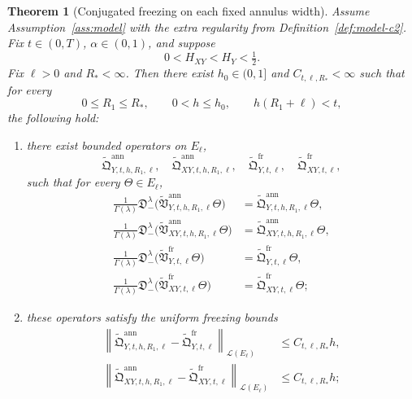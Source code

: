 \documentclass[11pt,a4paper]{amsart}
\theoremstyle{plain}
\newtheorem{theorem}{Theorem}[section]
\theoremstyle{definition}
\theoremstyle{remark}
\begin{document}
\begin{theorem}[Conjugated freezing on each fixed annulus width]
\label{thm:annulus-conjugated}
Assume Assumption~\ref{ass:model} with the extra regularity from
Definition~\ref{def:model-c2}. Fix \(t\in(0,T)\), \(\alpha\in(0,1)\), and suppose
\[
0<H_{XY}<H_Y<\tfrac12.
\]
Fix \(\ell>0\) and \(R_*<\infty\). Then there exist \(h_0\in(0,1]\) and
\(C_{t,\ell,R_*}<\infty\) such that for every
\[
0\le R_1\le R_*,
\qquad
0<h\le h_0,
\qquad
h(R_1+\ell)<t,
\]
the following hold:
\begin{enumerate}[label=(\roman*)]
\item there exist bounded operators on \(E_\ell\),
\[
\widetilde{\mathfrak Q}_{Y,t,h,R_1,\ell}^{\mathrm{ann}},
\quad
\widetilde{\mathfrak Q}_{XY,t,h,R_1,\ell}^{\mathrm{ann}},
\quad
\widetilde{\mathfrak Q}_{Y,t,\ell}^{\mathrm{fr}},
\quad
\widetilde{\mathfrak Q}_{XY,t,\ell}^{\mathrm{fr}},
\]
such that for every \(\Theta\in E_\ell\),
\begin{align}
\frac{1}{\Gamma(\lambda)}
\mathfrak D_-^\lambda
\bigl(
\widetilde{\mathfrak V}_{Y,t,h,R_1,\ell}^{\mathrm{ann}}\Theta
\bigr)
&=
\widetilde{\mathfrak Q}_{Y,t,h,R_1,\ell}^{\mathrm{ann}}\Theta,
\label{eq:annulus-QY}\\
\frac{1}{\Gamma(\lambda)}
\mathfrak D_-^\lambda
\bigl(
\widetilde{\mathfrak V}_{XY,t,h,R_1,\ell}^{\mathrm{ann}}\Theta
\bigr)
&=
\widetilde{\mathfrak Q}_{XY,t,h,R_1,\ell}^{\mathrm{ann}}\Theta,
\label{eq:annulus-QXY}\\
\frac{1}{\Gamma(\lambda)}
\mathfrak D_-^\lambda
\bigl(
\widetilde{\mathfrak V}_{Y,t,\ell}^{\mathrm{fr}}\Theta
\bigr)
&=
\widetilde{\mathfrak Q}_{Y,t,\ell}^{\mathrm{fr}}\Theta,
\label{eq:annulus-QY-fr}\\
\frac{1}{\Gamma(\lambda)}
\mathfrak D_-^\lambda
\bigl(
\widetilde{\mathfrak V}_{XY,t,\ell}^{\mathrm{fr}}\Theta
\bigr)
&=
\widetilde{\mathfrak Q}_{XY,t,\ell}^{\mathrm{fr}}\Theta;
\label{eq:annulus-QXY-fr}
\end{align}
\item these operators satisfy the uniform freezing bounds
\begin{align}
\left\|
\widetilde{\mathfrak Q}_{Y,t,h,R_1,\ell}^{\mathrm{ann}}
-
\widetilde{\mathfrak Q}_{Y,t,\ell}^{\mathrm{fr}}
\right\|_{\mathcal L(E_\ell)}
&\le
C_{t,\ell,R_*}h,
\label{eq:annulus-QY-close}\\
\left\|
\widetilde{\mathfrak Q}_{XY,t,h,R_1,\ell}^{\mathrm{ann}}
-
\widetilde{\mathfrak Q}_{XY,t,\ell}^{\mathrm{fr}}
\right\|_{\mathcal L(E_\ell)}
&\le
C_{t,\ell,R_*}h;
\label{eq:annulus-QXY-close}

\end{align}
\end{enumerate}
\end{theorem}
\end{document}
